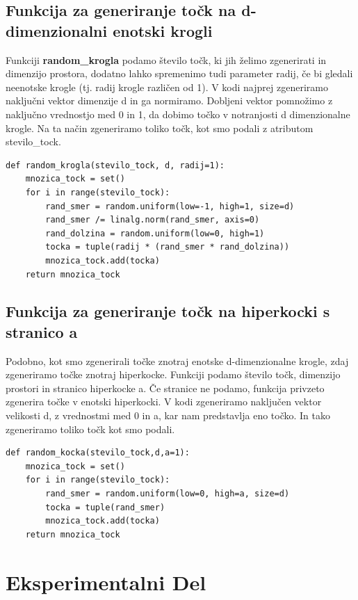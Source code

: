 \documentclass{article}
\begin{document}
\subsection{Funkcija za generiranje točk na d-dimenzionalni enotski krogli}
Funkciji \textbf{random\_krogla} podamo število točk, ki jih želimo zgenerirati in dimenzijo prostora, dodatno lahko spremenimo tudi parameter radij, če bi gledali neenotske krogle (tj. radij krogle različen od 1). V kodi najprej zgeneriramo naključni vektor dimenzije d in ga normiramo. Dobljeni vektor pomnožimo z naključno vrednostjo med 0 in 1, da dobimo točko v notranjosti d dimenzionalne krogle. Na ta način zgeneriramo toliko točk, kot smo podali z atributom stevilo\_tock.
\begin{verbatim}
def random_krogla(stevilo_tock, d, radij=1):
    mnozica_tock = set()
    for i in range(stevilo_tock):    
        rand_smer = random.uniform(low=-1, high=1, size=d) 
        rand_smer /= linalg.norm(rand_smer, axis=0) 
        rand_dolzina = random.uniform(low=0, high=1) 
        tocka = tuple(radij * (rand_smer * rand_dolzina)) 
        mnozica_tock.add(tocka)
    return mnozica_tock
\end{verbatim}


\subsection{Funkcija za generiranje točk na hiperkocki s stranico a}
Podobno, kot smo zgenerirali točke znotraj enotske d-dimenzionalne krogle, zdaj zgeneriramo točke znotraj hiperkocke. Funkciji podamo število točk, dimenzijo prostori in stranico hiperkocke a. Če stranice ne podamo, funkcija privzeto zgenerira točke v enotski hiperkocki. V kodi zgeneriramo naključen vektor velikosti d, z vrednostmi med 0 in a, kar nam predstavlja eno točko. In tako zgeneriramo toliko točk kot smo podali.
\begin{verbatim}
def random_kocka(stevilo_tock,d,a=1): 
    mnozica_tock = set()
    for i in range(stevilo_tock):
        rand_smer = random.uniform(low=0, high=a, size=d)
        tocka = tuple(rand_smer)
        mnozica_tock.add(tocka)
    return mnozica_tock
\end{verbatim}





\section{Eksperimentalni Del}
\end{document}
